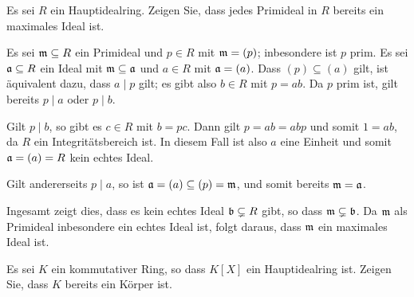 \begin{question}
  Es sei $R$ ein Hauptidealring.
  Zeigen Sie, dass jedes Primideal in $R$ bereits ein maximales Ideal ist.
\end{question}


\begin{solution}
  Es sei $\mathfrak{m} \subseteq R$ ein Primideal und $p \in R$ mit $\mathfrak{m} = (p)$;
  inbesondere ist $p$ prim.
  Es sei $\mathfrak{a} \subseteq R$ ein Ideal mit $\mathfrak{m} \subseteq \mathfrak{a}$ und $a \in R$ mit $\mathfrak{a} = (a)$.
  Dass $(p) \subseteq (a)$ gilt, ist äquivalent dazu, dass $a \mid p$ gilt;
  es gibt also $b \in R$ mit $p = ab$.
  Da $p$ prim ist, gilt bereits $p \mid a$ oder $p \mid b$.
  
  Gilt $p \mid b$, so gibt es $c \in R$ mit $b = pc$.
  Dann gilt $p = ab = abp$ und somit $1 = ab$, da $R$ ein Integritätsbereich ist.
  In diesem Fall ist also $a$ eine Einheit und somit $\mathfrak{a} = (a) = R$ kein echtes Ideal.
  
  Gilt andererseits $p \mid a$, so ist $\mathfrak{a} = (a) \subseteq (p) = \mathfrak{m}$, und somit bereits $\mathfrak{m} = \mathfrak{a}$.
  
  Ingesamt zeigt dies, dass es kein echtes Ideal $\mathfrak{b} \subsetneq R$ gibt, so dass $\mathfrak{m} \subsetneq \mathfrak{b}$.
  Da $\mathfrak{m}$ als Primideal inbesondere ein echtes Ideal ist, folgt daraus, dass $\mathfrak{m}$ ein maximales Ideal ist.
\end{solution}


\begin{question}
  \label{question: fields are the only rings for which the polynomial ring is a pid}
  Es sei $K$ ein kommutativer Ring, so dass $K[X]$ ein Hauptidealring ist.
  Zeigen Sie, dass $K$ bereits ein Körper ist.
\end{question}


